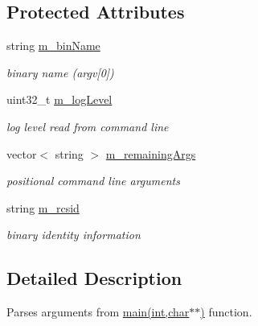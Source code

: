 \subsection*{Protected Attributes}
\begin{DoxyCompactItemize}
\item 
string \hyperlink{classxtd_1_1Application_abdf4c6f863c5a7a4ee842906f546c458}{m\+\_\+bin\+Name}
\begin{DoxyCompactList}\small\item\em binary name (argv\mbox{[}0\mbox{]}) \end{DoxyCompactList}\item 
uint32\+\_\+t \hyperlink{classxtd_1_1Application_a3f815061d81aa12974b2b6ee48b9f5e9}{m\+\_\+log\+Level}
\begin{DoxyCompactList}\small\item\em log level read from command line \end{DoxyCompactList}\item 
vector$<$ string $>$ \hyperlink{classxtd_1_1Application_a7651fd3849530cdded556187a6b42c25}{m\+\_\+remaining\+Args}
\begin{DoxyCompactList}\small\item\em positional command line arguments \end{DoxyCompactList}\item 
string \hyperlink{classxtd_1_1Application_ad820953bc15b729ce010f422595d3a3f}{m\+\_\+rcsid}
\begin{DoxyCompactList}\small\item\em binary identity information \end{DoxyCompactList}\end{DoxyCompactItemize}


\subsection{Detailed Description}
Parses arguments from \hyperlink{doc_2example_2Application_8hh_a6b77b2233054447db17959182b5fb02b}{main(int,char$\ast$$\ast$)} function. 


